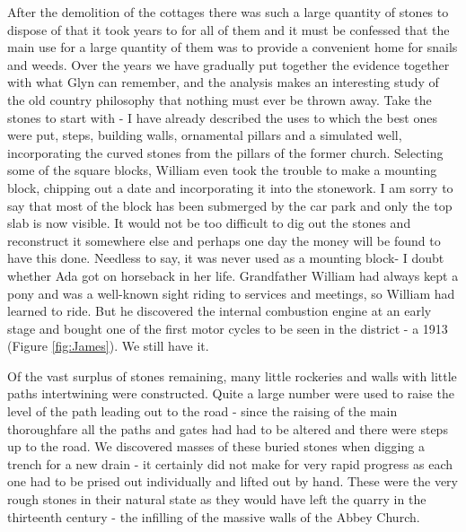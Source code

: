 After the demolition of the cottages there was such a large quantity of stones to dispose of that it took years to  for all of them and it must be confessed that the main use for a large quantity of them was to provide a convenient home for snails and weeds. Over the years we have gradually put together the evidence together with what Glyn can remember, and the analysis makes an interesting study of the old country philosophy that nothing must ever be thrown away. Take the stones to start with - I have already described the uses to which the best ones were put, steps, building walls, ornamental pillars and a simulated well, incorporating the curved stones from the pillars of the former church. Selecting some of the square blocks, William even took the trouble to make a mounting block, chipping out a date and incorporating it into the stonework. I am sorry to say that most of the block has been submerged by the car park and only the top slab is now visible. It would not be too difficult to dig out the stones and reconstruct it somewhere else and perhaps one day the money will be found to have this done. Needless to say, it was never used as a mounting block- I doubt whether Ada got on horseback in her life. Grandfather William had always kept a pony and was a well-known sight riding to services and meetings, so William had learned to ride. But he discovered the internal combustion engine at an early stage and bought one of the first motor cycles to be seen in the district - a 1913  (Figure \ref{fig:James}). We still have it.

Of the vast surplus of stones remaining, many little rockeries and walls with little paths intertwining were constructed. Quite a large number were used to raise the level of the path leading out to the road - since the raising of the main thoroughfare all the paths and gates had had to be altered and there were steps up to the road. We discovered masses of these buried stones when digging a trench for a new drain - it certainly did not make for very rapid progress as each one had to be prised out individually and lifted out by hand. These were the very rough stones in their natural state as they would have left the quarry in the thirteenth century - the infilling of the massive walls of the Abbey Church.

